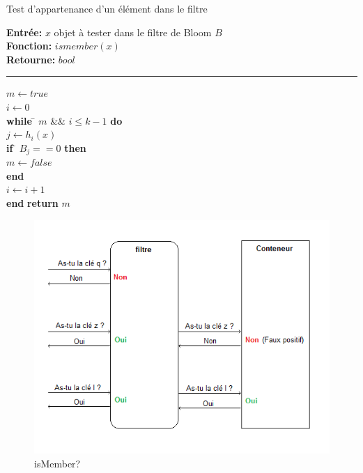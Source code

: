 \begin{algorithme}
	Test d'appartenance d'un élément dans le filtre
\end{algorithme}

\begin{flushleft}
	\begin{framed}
		\textbf{Entrée:} $x$ objet à tester dans le filtre de Bloom $B$\\
		\textbf{Fonction:} $ismember(x)$\\
		\textbf{Retourne:} $bool$

		\noindent\rule{\linewidth}{0.5pt}

		\begin{tabbing}
			$m \leftarrow true$\\
			$i \leftarrow 0$\\
			\textbf{while} \= $m$ \&\& $i \leq k - 1$ \textbf{do}\\
					\> $j \leftarrow h_i(x)$\\
					\> \textbf{if} \= $B_j == 0$ \textbf{then}\\
					\> \> $m \leftarrow false$\\
					\> \textbf{end}\\
					\> $i \leftarrow i + 1$\\
			\textbf{end}
			\textbf{return} $m$\\
	    	\end{tabbing}		
	\end{framed}
\end{flushleft}

\begin{figure}[!htbp]
	\centering
	\includegraphics[width =12cm]{ismember.png}
	\caption{isMember?}
\end{figure}	

	
	
	
	
	
	
	
	
	
	
	
	
	
	
	
	
	
	
	
	
	